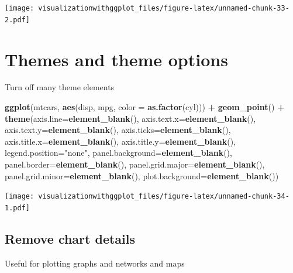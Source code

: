 \documentclass[]{krantz}
\makeatletter
\newenvironment{Shaded}{\begin{snugshade}}{\end{snugshade}}
\newcommand{\DataTypeTok}[1]{\textcolor[rgb]{0.13,0.29,0.53}{#1}}
\newcommand{\KeywordTok}[1]{\textcolor[rgb]{0.13,0.29,0.53}{\textbf{#1}}}
\newcommand{\NormalTok}[1]{#1}
\newcommand{\OperatorTok}[1]{\textcolor[rgb]{0.81,0.36,0.00}{\textbf{#1}}}
\newcommand{\StringTok}[1]{\textcolor[rgb]{0.31,0.60,0.02}{#1}}
\newenvironment{kframe}{%
\medskip{}
\setlength{\fboxsep}{.8em}
 \def\at@end@of@kframe{}%
 \ifinner\ifhmode%
  \def\at@end@of@kframe{\end{minipage}}%
  \begin{minipage}{\columnwidth}%
 \fi\fi%
 \def\FrameCommand##1{\hskip\@totalleftmargin \hskip-\fboxsep
 \colorbox{shadecolor}{##1}\hskip-\fboxsep
     \hskip-\linewidth \hskip-\@totalleftmargin \hskip\columnwidth}%
 \MakeFramed {\advance\hsize-\width
   \@totalleftmargin\z@ \linewidth\hsize
   \@setminipage}}%
 {\par\unskip\endMakeFramed%
 \at@end@of@kframe}
\renewenvironment{Shaded}{\begin{kframe}}{\end{kframe}}
\makeatother
\begin{document}
\texttt{[image: visualizationwithggplot\_files/figure-latex/unnamed-chunk-33-2.pdf]}

\hypertarget{themes-and-theme-options}{%
\section{Themes and theme options}\label{themes-and-theme-options}}

Turn off many theme elements

\begin{Shaded}
\begin{Highlighting}[]
\KeywordTok{ggplot}\NormalTok{(mtcars, }\KeywordTok{aes}\NormalTok{(disp, mpg, }\DataTypeTok{color =} \KeywordTok{as.factor}\NormalTok{(cyl))) }\OperatorTok{+}\StringTok{ }
\KeywordTok{geom_point}\NormalTok{() }\OperatorTok{+}
\StringTok{    }\KeywordTok{theme}\NormalTok{(}\DataTypeTok{axis.line=}\KeywordTok{element_blank}\NormalTok{(), }\DataTypeTok{axis.text.x=}\KeywordTok{element_blank}\NormalTok{(),   }\DataTypeTok{axis.text.y=}\KeywordTok{element_blank}\NormalTok{(), }\DataTypeTok{axis.ticks=}\KeywordTok{element_blank}\NormalTok{(),    }\DataTypeTok{axis.title.x=}\KeywordTok{element_blank}\NormalTok{(), }\DataTypeTok{axis.title.y=}\KeywordTok{element_blank}\NormalTok{(),     }\DataTypeTok{legend.position=}\StringTok{"none"}\NormalTok{, }\DataTypeTok{panel.background=}\KeywordTok{element_blank}\NormalTok{(),   }\DataTypeTok{panel.border=}\KeywordTok{element_blank}\NormalTok{(), }\DataTypeTok{panel.grid.major=}\KeywordTok{element_blank}\NormalTok{(),     }\DataTypeTok{panel.grid.minor=}\KeywordTok{element_blank}\NormalTok{(), }\DataTypeTok{plot.background=}\KeywordTok{element_blank}\NormalTok{())}
\end{Highlighting}
\end{Shaded}

\texttt{[image: visualizationwithggplot\_files/figure-latex/unnamed-chunk-34-1.pdf]}

\hypertarget{remove-chart-details}{%
\subsection{Remove chart details}\label{remove-chart-details}}

Useful for plotting graphs and networks and maps
\end{document}
